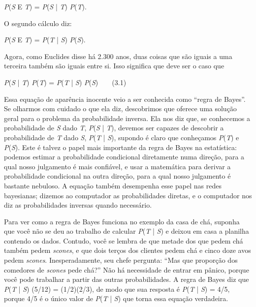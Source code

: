 \documentclass[11pt,a5paper,twoside]{book}
\begin{document}
\textit{P}(\textit{S} E \textit{T}) = \textit{P}(\textit{S} | \textit{T}) \textit{P}(\textit{T}).

O segundo cálculo diz:

\textit{P}(\textit{S} E \textit{T}) = \textit{P}(\textit{T} | \textit{S}) \textit{P}(\textit{S}).

Agora, como Euclides disse há 2.300 anos, duas coisas que são iguais a uma terceira também são iguais entre si. Isso significa que deve ser o caso que

\textit{P}(\textit{S} | \textit{T}) \textit{P}(\textit{T}) = \textit{P}(\textit{T} | \textit{S}) \textit{P}(\textit{S})  (3.1)

Essa equação de aparência inocente veio a ser conhecida como “regra de Bayes”. Se olharmos com cuidado o que ela diz, descobrimos que oferece uma solução geral para o problema da probabilidade inversa. Ela nos diz que, se conhecemos a probabilidade de \textit{S} dado \textit{T}, \textit{P}(\textit{S} | \textit{T}), devemos ser capazes de descobrir a probabilidade de \textit{T} dado \textit{S}, \textit{P}(\textit{T} | \textit{S}), supondo é claro que conheçamos \textit{P}(\textit{T}) e \textit{P}(\textit{S}). Este é talvez o papel mais importante da regra de Bayes na estatística: podemos estimar a probabilidade condicional diretamente numa direção, para a qual nosso julgamento é mais confiável, e usar a matemática para derivar a probabilidade condicional na outra direção, para a qual nosso julgamento é bastante nebuloso. A equação também desempenha esse papel nas redes bayesianas; dizemos ao computador as probabilidades diretas, e o computador nos diz as probabilidades inversas quando necessário.

Para ver como a regra de Bayes funciona no exemplo da casa de chá, suponha que você não se deu ao trabalho de calcular \textit{P}(\textit{T} | \textit{S}) e deixou em casa a planilha contendo os dados. Contudo, você se lembra de que metade dos que pedem chá também pedem \textit{scones}, e que dois terços dos clientes pedem chá e cinco doze avos pedem \textit{scones}. Inesperadamente, seu chefe pergunta: “Mas que proporção dos comedores de \textit{scones} pede chá?” Não há necessidade de entrar em pânico, porque você pode trabalhar a partir das outras probabilidades. A regra de Bayes diz que \textit{P}(\textit{T} | \textit{S}) (5/12) = (1/2)(2/3), de modo que sua resposta é \textit{P}(\textit{T} | \textit{S}) = 4/5, porque 4/5 é o único valor de \textit{P}(\textit{T} | \textit{S}) que torna essa equação verdadeira.
\end{document}
